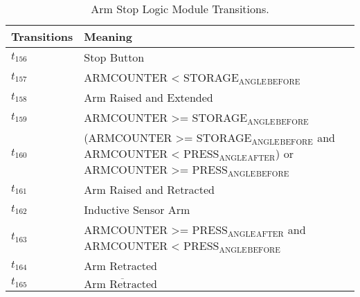 \begin{table}[H]
\caption{Arm Stop Logic Module Transitions.}
\centering
\begin{tabular}{M{5cm}M{10cm}}
Transitions & Meaning\\
\hline
\hyperlink{partialNet:t1561}{\hypertarget{partialTable:t156}{$t_{156}$}} & Stop Button\\
\hyperlink{partialNet:t1571}{\hypertarget{partialTable:t157}{$t_{157}$}} & ARMCOUNTER < STORAGE\(_{\text{ANGLE}}\)\(_{\text{BEFORE}}\)\\
\hyperlink{partialNet:t1581}{\hypertarget{partialTable:t158}{$t_{158}$}} & Arm Raised and Extended\\
\hyperlink{partialNet:t1591}{\hypertarget{partialTable:t159}{$t_{159}$}} & ARMCOUNTER >= STORAGE\(_{\text{ANGLE}}\)\(_{\text{BEFORE}}\)\\
\hyperlink{partialNet:t1601}{\hypertarget{partialTable:t160}{$t_{160}$}} & (ARMCOUNTER >= STORAGE\(_{\text{ANGLE}}\)\(_{\text{BEFORE}}\) and ARMCOUNTER < PRESS\(_{\text{ANGLE}}\)\(_{\text{AFTER}}\)) or ARMCOUNTER >= PRESS\(_{\text{ANGLE}}\)\(_{\text{BEFORE}}\)\\
\hyperlink{partialNet:t1611}{\hypertarget{partialTable:t161}{$t_{161}$}} & Arm Raised and Retracted\\
\hyperlink{partialNet:t1621}{\hypertarget{partialTable:t162}{$t_{162}$}} & Inductive Sensor Arm\\
\hyperlink{partialNet:t1631}{\hypertarget{partialTable:t163}{$t_{163}$}} & ARMCOUNTER >= PRESS\(_{\text{ANGLE}}\)\(_{\text{AFTER}}\) and ARMCOUNTER < PRESS\(_{\text{ANGLE}}\)\(_{\text{BEFORE}}\)\\
\hyperlink{partialNet:t1641}{\hypertarget{partialTable:t164}{$t_{164}$}} & Arm Retracted\\
\hyperlink{partialNet:t1651}{\hypertarget{partialTable:t165}{$t_{165}$}} & \(\overline{\mbox{Arm Retracted }}\)\\
\end{tabular}
\end{table}
